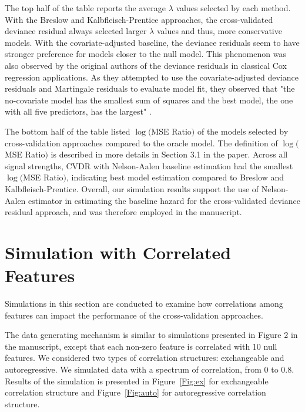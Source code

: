 \documentclass{article}
\begin{document}
The top half of the table reports the average $\lambda$ values selected by each method. With the Breslow and Kalbfleisch-Prentice approaches, the cross-validated deviance residual always selected larger $\lambda$ values and thus, more conservative models. With the covariate-adjusted baseline, the deviance residuals seem to have stronger preference for models closer to the null model. This phenomenon was also observed by the original authors of the deviance residuals in classical Cox regression applications. As they attempted to use the covariate-adjusted deviance residuals and Martingale residuals to evaluate model fit, they observed that "the no-covariate model has the smallest sum of squares and the best model, the one with all five predictors, has the largest" \citep{Therneau2000modeling}.

The bottom half of the table listed $\log($MSE Ratio$)$ of the models selected by cross-validation approaches compared to the oracle model. The definition of $\log($MSE Ratio$)$ is described in more details in Section 3.1 in the paper. Across all signal strengths, CVDR with Nelson-Aalen baseline estimation had the smallest $\log($MSE Ratio$)$, indicating best model estimation compared to Breslow and Kalbfleisch-Prentice. Overall, our simulation results support the use of Nelson-Aalen estimator in estimating the baseline hazard for the cross-validated deviance residual approach, and was therefore employed in the manuscript.

\section{Simulation with Correlated Features}

Simulations in this section are conducted to examine how correlations among features can impact the performance of the cross-validation approaches.

The data generating mechanism is similar to simulations presented in Figure 2 in the manuscript, except that each non-zero feature is correlated with 10 null features. We considered two types of correlation structures: exchangeable and autoregressive. We simulated data with a spectrum of correlation, from 0 to 0.8. Results of the simulation is presented in Figure~\ref{Fig:ex} for exchangeable correlation structure and Figure~\ref{Fig:auto} for autoregressive correlation structure.
\end{document}
